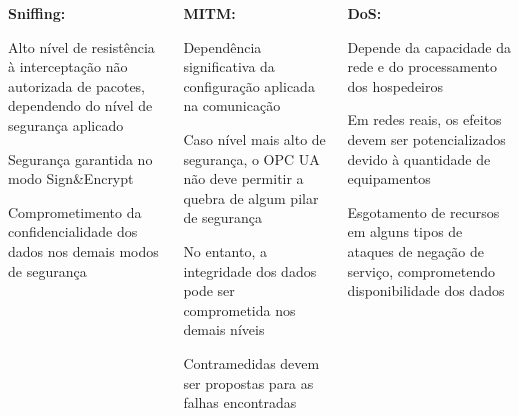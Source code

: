 \documentclass{uspBeamer}
\begin{document}
    \begin{frame}
        \begin{columns}[t]
            \begin{column}{.33\textwidth}
                \textbf{Sniffing:}
                \begin{wideitemize}
                    \item Alto nível de resistência à interceptação não autorizada de pacotes, dependendo do nível de segurança aplicado
                    \item Segurança garantida no modo Sign\&Encrypt
                    \item Comprometimento da confidencialidade dos dados nos demais modos de segurança
                \end{wideitemize}
            \end{column}
            \begin{column}{.33\textwidth}
                \textbf{MITM:}
                \begin{wideitemize}
                    \item Dependência significativa da configuração aplicada na comunicação
                    \item Caso nível mais alto de segurança, o OPC UA não deve permitir a quebra de algum pilar de segurança
                    \item No entanto, a integridade dos dados pode ser comprometida nos demais níveis
                    \item Contramedidas devem ser propostas para as falhas encontradas 
                \end{wideitemize}
            \end{column}
            \begin{column}{.33\textwidth}
                \textbf{DoS:}
                \begin{wideitemize}
                    \item Depende da capacidade da rede e do processamento dos hospedeiros
                    \item Em redes reais, os efeitos devem ser potencializados devido à quantidade de equipamentos
                    \item Esgotamento de recursos em alguns tipos de ataques de negação de serviço, comprometendo disponibilidade dos dados
                \end{wideitemize}
            \end{column}
        \end{columns}
    \end{frame}
\end{document}

